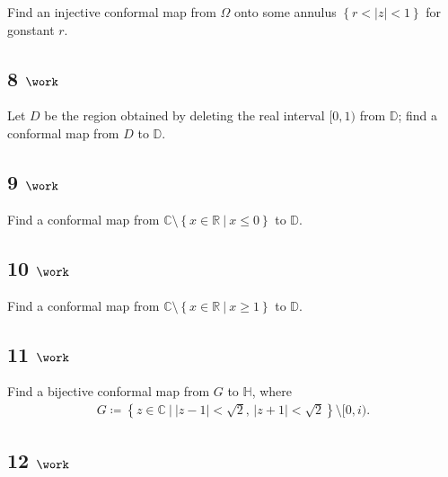 Find an injective conformal map from \(\Omega\) onto some annulus
\(\left\{{r < {\left\lvert {z} \right\rvert} < 1}\right\}\) for gonstant
\(r\).

\hypertarget{work-23}{%
\subsection{\texorpdfstring{8
\(\work\)}{8 \textbackslash work}}\label{work-23}}

Let \(D\) be the region obtained by deleting the real interval
\([0, 1)\) from \({\mathbb{D}}\); find a conformal map from \(D\) to
\({\mathbb{D}}\).

\hypertarget{work-24}{%
\subsection{\texorpdfstring{9
\(\work\)}{9 \textbackslash work}}\label{work-24}}

Find a conformal map from
\({\mathbb{C}}\setminus\left\{{x\in {\mathbb{R}}{~\mathrel{\Big|}~}x\leq 0}\right\}\)
to \({\mathbb{D}}\).

\hypertarget{work-25}{%
\subsection{\texorpdfstring{10
\(\work\)}{10 \textbackslash work}}\label{work-25}}

Find a conformal map from
\({\mathbb{C}}\setminus\left\{{x\in {\mathbb{R}}{~\mathrel{\Big|}~}x\geq 1}\right\}\)
to \({\mathbb{D}}\).

\hypertarget{work-26}{%
\subsection{\texorpdfstring{11
\(\work\)}{11 \textbackslash work}}\label{work-26}}

Find a bijective conformal map from \(G\) to \({\mathbb{H}}\), where
\begin{align*}  
G \coloneqq\left\{{z\in {\mathbb{C}}{~\mathrel{\Big|}~}{\left\lvert {z-1} \right\rvert} < \sqrt 2,\, {\left\lvert {z+1} \right\rvert} < \sqrt 2}\right\} \setminus [0, i)
.\end{align*}

\hypertarget{work-27}{%
\subsection{\texorpdfstring{12
\(\work\)}{12 \textbackslash work}}\label{work-27}}

